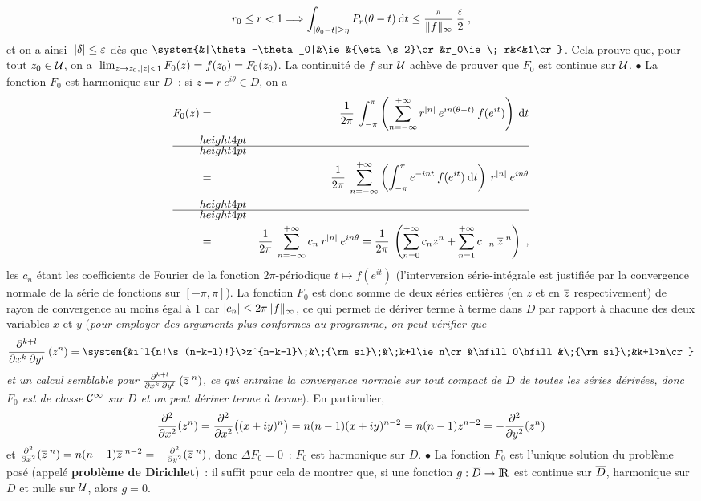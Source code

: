 \documentclass{article}
\begin{document}
$$r_0\leq r<1\Longrightarrow\int_{|\theta_0-t|\geq\eta}P_r(\theta-t)\>{\rm d}t\leq{\pi\over\|f\|_{\infty}}\>{\varepsilon\over2}\;,$$
et on a ainsi $\;|\delta|\leq\varepsilon$ d\`es que $\system{&|\theta-\theta_0|&\ie&{\eta\s2}\cr &r_0\ie\; r&<&1\cr}$. Cela prouve que, pour tout $z_0\in{\cal U}$, on a $\;\lim_{z\rightarrow z_0,|z|<1}F_0(z)=f(z_0)=F_0(z_0)$. La continuit\'e de $f$ sur ${\cal U}$ ach\`eve de prouver que $F_0$ est continue sur ${\cal U}$.\msk
$\bullet$ La fonction $F_0$ est harmonique sur $D$~: si $z=r\>e^{i\theta}\in D$, on a\vvv\vvv
\begin{eqnarray*}
F_0(z) & = & {1\s2\pi}\>\int_{-\pi}^{\pi}\lp\sum_{n=-\infty}^{\ii}r^{|n|}\>e^{in(\theta-t)}\>f(e^{it})\rp\>{\rm d}t\\
& = & {1\s2\pi}\>\sum_{n=-\infty}^{\ii}\lp\int_{-\pi}^{\pi}e^{-int}\>f(e^{it})\>{\rm d}t\rp\>r^{|n|}\>e^{in\theta}\\
& = & {1\s2\pi}\>\sum_{n=-\infty}^{\ii}c_n\>r^{|n|}\>e^{in\theta}
 =  {1\s2\pi}\>\lp\sum_{n=0}^{\ii}c_nz^n+\sum_{n=1}^{\ii}c_{-n}\>\ov{z}^{\;n}\rp\;,
\end{eqnarray*}
les $c_n$ \'etant les coefficients de Fourier de la fonction $2\pi$-p\'eriodique $t\mapsto f(e^{it})$ (l'interversion s\'erie-int\'egrale est justifi\'ee par la convergence normale de la s\'erie de fonctions sur $[-\pi,\pi]$). La fonction $F_0$ est donc somme de deux s\'eries enti\`eres (en $z$ et en $\overline{z}$ respectivement) de rayon de convergence au moins \'egal \`a 1 car $|c_n|\leq2\pi\|f\|_{\infty}$, ce qui permet de d\'eriver terme \`a terme dans $D$ par rapport \`a chacune des deux variables $x$ et $y$ ({\it pour employer des arguments plus conformes au programme, on peut v\'erifier que\vv $${\ddd^{k+l}\s\ddd x^k\>\ddd y^l}\>(z^n)=\system{&i^l{n!\s (n-k-l)!}\>z^{n-k-l}\;&\;{\rm  si}\;&\;k+l\ie n\cr &\hfill 0\hfill &\;{\rm si}\;&k+l>n\cr}$$
et un calcul semblable pour ${\partial^{k+l}\over\partial x^k\>\partial y^l}\>(\overline{z}^{\;n})$,
ce qui entra\^\i ne la convergence normale sur tout compact de $D$ de toutes les s\'eries d\'eriv\'ees, donc $F_0$ est de classe ${\cal C}^{\infty}$ sur $D$ et on peut d\'eriver terme \`a terme}). En particulier,\vv
$${\partial^2\over\partial x^2}(z^n)={\partial^2\over\partial x^2}\big((x+iy)^n\big)=n(n-1)(x+iy)^{n-2}=n(n-1)z^{n-2}=-{\partial^2\over\partial y^2}(z^n)$$
et ${\partial^2\over\partial x^2}(\overline{z}^{\;n})=n(n-1)\overline{z}^{\;n-2}=-{\partial^2\over\partial y^2}(\overline{z}^{\;n})$, donc $\Delta F_0=0$~: $F_0$ est harmonique sur $D$.
\msk
$\bullet$ La fonction $F_0$ est l'unique solution du probl\`eme pos\'e (appel\'e {\bf probl\`eme de Dirichlet})~: il suffit pour cela de montrer que, si une fonction $g:\overline{D}\rightarrow{\rm I\kern-0.6mm R}$ est continue sur $\overline{D}$, harmonique sur $D$ et nulle sur ${\cal U}$, alors $g=0$.\ssk\sect
\end{document}
